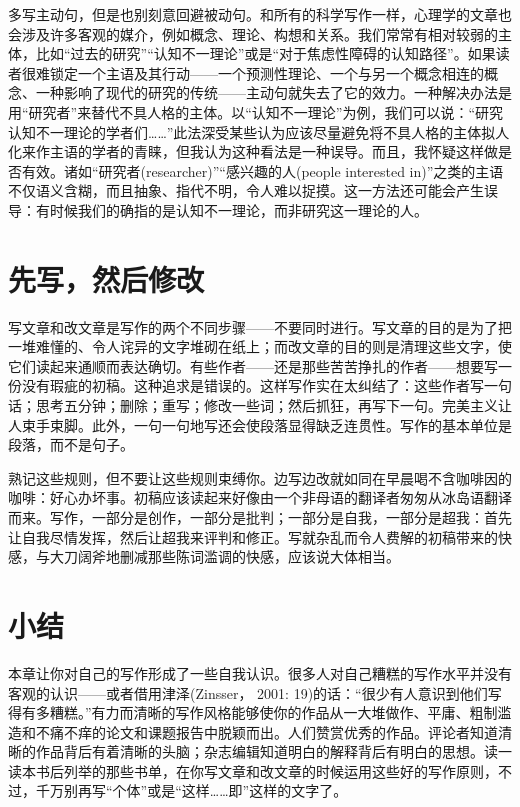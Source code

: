 多写主动句，但是也别刻意回避被动句。和所有的科学写作一样，心理学的文章也会涉及许多客观的媒介，例如概念、理论、构想和关系。我们常常有相对较弱的主体，比如“过去的研究”“认知不一理论”或是“对于焦虑性障碍的认知路径”。如果读者很难锁定一个主语及其行动——一个预测性理论、一个与另一个概念相连的概念、一种影响了现代的研究的传统——主动句就失去了它的效力。一种解决办法是用“研究者”来替代不具人格的主体。以“认知不一理论”为例，我们可以说：“研究认知不一理论的学者们……”此法深受某些认为应该尽量避免将不具人格的主体拟人化来作主语的学者的青睐，但我认为这种看法是一种误导。而且，我怀疑这样做是否有效。诸如“研究者(researcher)”“感兴趣的人(people interested in)”之类的主语不仅语义含糊，而且抽象、指代不明，令人难以捉摸。这一方法还可能会产生误导：有时候我们的确指的是认知不一理论，而非研究这一理论的人。



\section{先写，然后修改}
写文章和改文章是写作的两个不同步骤——不要同时进行。写文章的目的是为了把一堆难懂的、令人诧异的文字堆砌在纸上；而改文章的目的则是清理这些文字，使它们读起来通顺而表达确切。有些作者——还是那些苦苦挣扎的作者——想要写一份没有瑕疵的初稿。这种追求是错误的。这样写作实在太纠结了：这些作者写一句话；思考五分钟；删除；重写；修改一些词；然后抓狂，再写下一句。完美主义让人束手束脚。此外，一句一句地写还会使段落显得缺乏连贯性。写作的基本单位是段落，而不是句子。

熟记这些规则，但不要让这些规则束缚你。边写边改就如同在早晨喝不含咖啡因的咖啡：好心办坏事。初稿应该读起来好像由一个非母语的翻译者匆匆从冰岛语翻译而来。写作，一部分是创作，一部分是批判；一部分是自我，一部分是超我：首先让自我尽情发挥，然后让超我来评判和修正。写就杂乱而令人费解的初稿带来的快感，与大刀阔斧地删减那些陈词滥调的快感，应该说大体相当。


\section{小结}
本章让你对自己的写作形成了一些自我认识。很多人对自己糟糕的写作水平并没有客观的认识——或者借用津泽(Zinsser， 2001: 19)的话：“很少有人意识到他们写得有多糟糕。”有力而清晰的写作风格能够使你的作品从一大堆做作、平庸、粗制滥造和不痛不痒的论文和课题报告中脱颖而出。人们赞赏优秀的作品。评论者知道清晰的作品背后有着清晰的头脑；杂志编辑知道明白的解释背后有明白的思想。读一读本书后列举的那些书单，在你写文章和改文章的时候运用这些好的写作原则，不过，千万别再写“个体”或是“这样……即”这样的文字了。